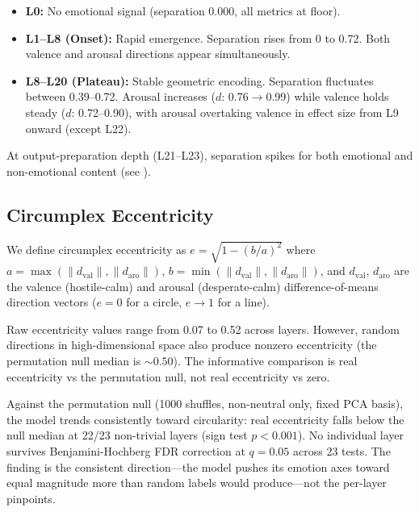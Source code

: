 \documentclass[11pt,a4paper]{article}
\begin{document}
\begin{itemize}[nosep]
    \item \textbf{L0:} No emotional signal (separation 0.000, all
          metrics at floor).
    \item \textbf{L1--L8 (Onset):} Rapid emergence. Separation rises
          from 0 to 0.72. Both valence and arousal directions appear
          simultaneously.
    \item \textbf{L8--L20 (Plateau):} Stable geometric encoding.
          Separation fluctuates between 0.39--0.72. Arousal increases
          ($d$: 0.76$\to$0.99) while valence holds steady ($d$:
          0.72--0.90), with arousal overtaking valence in effect size
          from L9 onward (except L22).
\end{itemize}

At output-preparation depth (L21--L23), separation spikes for both
emotional and non-emotional content (see ).

\subsection{Circumplex Eccentricity}
\label{sec:eccentricity}

We define circumplex eccentricity as
$e = \sqrt{1 - (b/a)^2}$
where $a = \max(\|d_{\text{val}}\|, \|d_{\text{aro}}\|)$,
$b = \min(\|d_{\text{val}}\|, \|d_{\text{aro}}\|)$, and
$d_{\text{val}}$, $d_{\text{aro}}$ are the valence (hostile-calm) and
arousal (desperate-calm) difference-of-means direction vectors ($e = 0$
for a circle, $e \to 1$ for a line).

Raw eccentricity values range from 0.07 to 0.52 across layers. However,
random directions in high-dimensional space also produce nonzero
eccentricity (the permutation null median is ${\sim}0.50$). The
informative comparison is real eccentricity vs the permutation null, not
real eccentricity vs zero.

Against the permutation null (1000 shuffles, non-neutral only, fixed PCA
basis), the model trends consistently toward circularity: real
eccentricity falls below the null median at 22/23 non-trivial layers
(sign test $p < 0.001$). No individual layer survives
Benjamini-Hochberg FDR correction at $q = 0.05$ across 23 tests. The
finding is the consistent direction---the model pushes its emotion axes
toward equal magnitude more than random labels would produce---not the
per-layer pinpoints.
\end{document}
